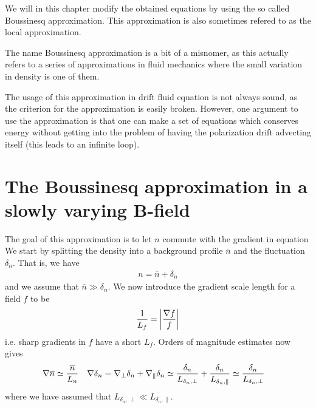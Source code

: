 We will in this chapter modify the obtained equations by using the so called
Boussinesq approximation. This approximation is also sometimes refered to as
the local approximation.

The name Boussinesq approximation is a bit of a misnomer, as this actually
refers to a series of approximations in fluid mechanics where the small
variation in density is one of them.

The usage of this approximation in drift fluid equation is not always sound, as
the criterion for the approximation is easily broken. However, one argument to
use the approximation is that one can make a set of equations which conserves
energy without getting into the problem of having the polarization drift
advecting itself (this leads to an infinite loop).

\section{The Boussinesq approximation in a slowly varying B-field}
\label{sec:boussinesq}
The goal of this approximation is to let $n$ commute with the gradient in
equation
We start by splitting the density into a background profile $\overline{n}$ and
the fluctuation $\delta_n$. That is, we have
%
\begin{align*}
    n = \overline{n} + \delta_n
\end{align*}
%
%
%
and we assume that $\overline{n} \gg \delta_n$. We now introduce the gradient
scale length for a field $f$ to be
%
\begin{align*}
    \frac{1}{L_f} = \left|\frac{\nabla f}{f}\right|
\end{align*}
%
i.e. sharp gradients in $f$ have a short $L_f$.
Orders of magnitude estimates now gives
%
\begin{align*}
    &\nabla \overline{n} \simeq \frac{\overline{n}}{L_n}&
    &\nabla \delta_n
    =
    \nabla_\perp \delta_n + \nabla_\| \delta_n
    \simeq \frac{\delta_n}{L_{\delta_n, \perp}} + \frac{\delta_n}{L_{\delta_n, \|}}
    \simeq \frac{\delta_n}{L_{\delta_n, \perp}}
    &
\end{align*}
%
where we have assumed that $L_{\delta_n, \perp} \ll L_{\delta_n, \|}$.

